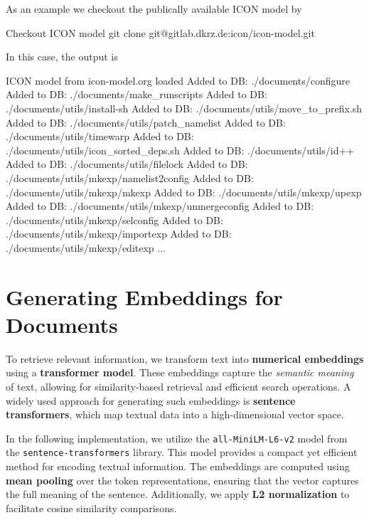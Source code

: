 As an example we checkout the publically available ICON model by
\begin{codeonly}{Checkout ICON model}
git clone git@gitlab.dkrz.de:icon/icon-model.git
\end{codeonly}

In this case, the output is
\begin{codeonly}{ICON model from icon-model.org loaded}
Added to DB: ./documents/configure
Added to DB: ./documents/make_runscripts
Added to DB: ./documents/utils/install-sh
Added to DB: ./documents/utils/move_to_prefix.sh
Added to DB: ./documents/utils/patch_namelist
Added to DB: ./documents/utils/timewarp
Added to DB: ./documents/utils/icon_sorted_deps.sh
Added to DB: ./documents/utils/id++
Added to DB: ./documents/utils/filelock
Added to DB: ./documents/utils/mkexp/namelist2config
Added to DB: ./documents/utils/mkexp/mkexp
Added to DB: ./documents/utils/mkexp/upexp
Added to DB: ./documents/utils/mkexp/unmergeconfig
Added to DB: ./documents/utils/mkexp/selconfig
Added to DB: ./documents/utils/mkexp/importexp
Added to DB: ./documents/utils/mkexp/editexp
...
\end{codeonly}




%
\section{Generating Embeddings for Documents}

To retrieve relevant information, we transform text into \textbf{numerical embeddings} using a \textbf{transformer model}. These embeddings capture the \textit{semantic meaning} of text, allowing for similarity-based retrieval and efficient search operations. A widely used approach for generating such embeddings is \textbf{sentence transformers}, which map textual data into a high-dimensional vector space.

In the following implementation, we utilize the \texttt{all-MiniLM-L6-v2} model from the \texttt{sentence-transformers} library. This model provides a compact yet efficient method for encoding textual information. The embeddings are computed using \textbf{mean pooling} over the token representations, ensuring that the vector captures the full meaning of the sentence. Additionally, we apply \textbf{L2 normalization} to facilitate cosine similarity comparisons.

